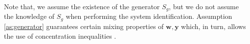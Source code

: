 \documentclass{ifacconf}
\def\rve{{\mathbf{e}}}
\def\rvq{{\mathbf{q}}}
\def\rvs{{\mathbf{s}}}
\def\rvw{{\mathbf{w}}}
\def\rvy{{\mathbf{y}}}
\def\sZ{{\mathbb{Z}}}
\newtheorem{lemma}{Lemma}[section]
\newcommand{\class}{\(\mathcal{SI}\)}
\begin{document}
Note that, we assume the existence of the generator $S_g$, but we do not assume the knowledge of $S_g$ when performing the system identification.
Assumption \ref{as:generator} guarantees certain mixing  properties of $\rvw,\rvy$ \cite[Lemma A4.1]{eringis2023pacbayesRNN_OLD} which, in turn, allows the use of concentration inequalities \cite{rio2000inegalites}.

    
\end{document}
